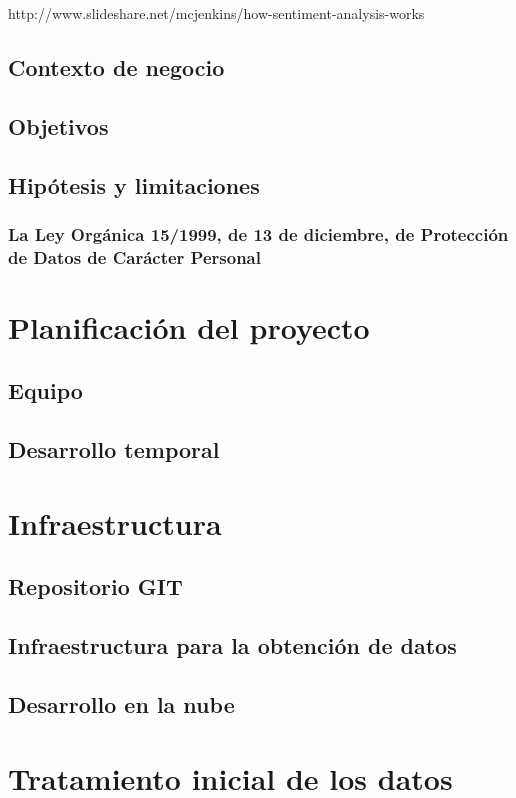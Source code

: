 \documentclass[11pt,a4paper,leqno,titlepage,twoside]{book}
\begin{document}
http://www.slideshare.net/mcjenkins/how-sentiment-analysis-works





\section{Contexto de negocio}
\section{Objetivos}
\section{Hip\'otesis y limitaciones}
\subsection{La Ley Orgánica 15/1999, de 13 de diciembre, de Protección de Datos
de Carácter Personal}

\chapter{Planificación del proyecto}
\section{Equipo}
\section{Desarrollo temporal}

\chapter{Infraestructura}
\section{Repositorio GIT}
\section{Infraestructura para la obtención de datos}
\section{Desarrollo en la nube}

\chapter{Tratamiento inicial de los datos}
\end{document}
